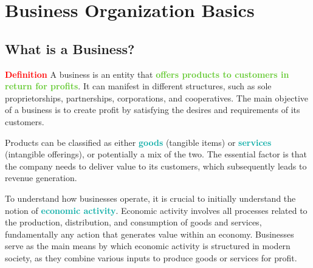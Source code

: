 \documentclass[twoside]{article}
\newcommand{\definition}[1]{\begin{definitionbox} \textcolor{red}{{\scriptsize\faStar} \textbf{Definition}} \newline #1 \end{definitionbox}}
\newcommand{\highlightbluetext}[1]{\textcolor[HTML]{09ACA6}{\textbf{#1}}}
\newcommand{\highlightgreentext}[1]{\textcolor[HTML]{62C92F}{\textbf{#1}}}
\numberwithin{equation}{section}
\begin{document}
	\fancyfoot{}

	\fancyfoot[RO, LE]{\thepage}
	
	\setcounter{page}{1}
	
	\tableofcontents
	
	\newpage

	\section{Business Organization Basics}
	\label{sec:BusinessOrganizationBasics}

	\subsection{What is a Business?}
	\label{subsec:WhatIsABusiness}
	\definition{A business is an entity that \highlightgreentext{offers products to customers in return for profits}. It can manifest in different structures, such as sole proprietorships, partnerships, corporations, and cooperatives. The main objective of a business is to create profit by satisfying the desires and requirements of its customers.}
	Products can be classified as either \highlightbluetext{goods} (tangible items) or \highlightbluetext{services} (intangible offerings), or potentially a mix of the two. The essential factor is that the company needs to deliver value to its customers, which subsequently leads to revenue generation. 

	To understand how businesses operate, it is crucial to initially understand the notion of \highlightbluetext{economic activity}. Economic activity involves all processes related to the production, distribution, and consumption of goods and services, fundamentally any action that generates value within an economy. Businesses serve as the main means by which economic activity is structured in modern society, as they combine various inputs to produce goods or services for profit.
\end{document}
